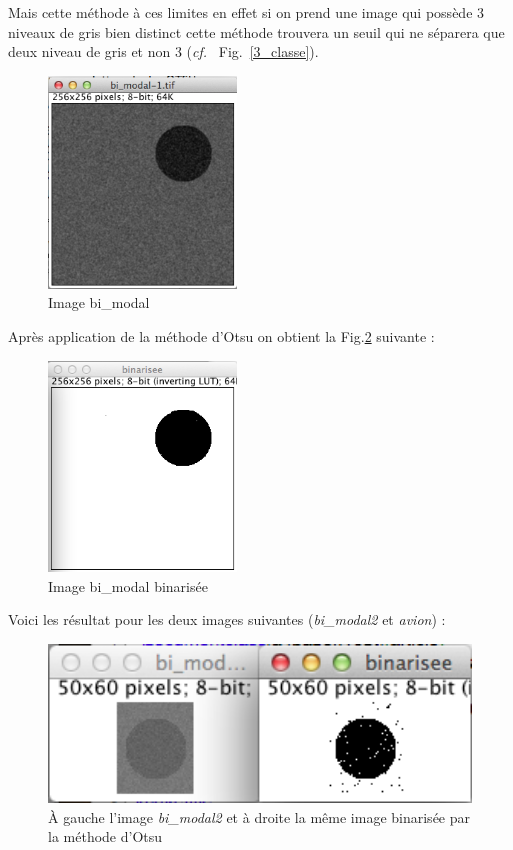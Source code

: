 \documentclass[a4paper,10pt]{article}
\begin{document}
Mais cette m\'ethode \`a ces limites en effet si on prend une image qui poss\`ede 3 niveaux de gris bien distinct cette m\'ethode trouvera un seuil qui ne s\'eparera que deux niveau de gris et non 3 (\emph{cf.} ~Fig.~\ref{3_classe}).


\begin{figure}[ht]
\begin{center}
	\includegraphics[width=5cm]{images/bi_modal}
\end{center}
	\caption{Image bi\_modal}
	\label{bi_modal}
\end{figure}

Apr\`es application de la m\'ethode d'Otsu on obtient la Fig.\ref{binarisee} suivante : 

\begin{figure}[ht]
\begin{center}
	\includegraphics[width=5cm]{images/bi_modal_binarisee}
\end{center}
	\caption{Image bi\_modal binaris\'ee}
	\label{binarisee}
\end{figure}

\newpage

Voici les r\'esultat pour les deux images suivantes (\emph{bi\_modal2} et \emph{avion}) :

\begin{figure}[ht]
\begin{center}
	\includegraphics[width=13cm]{images/bi_modal_2}
\end{center}
	\caption{\`A gauche l'image \emph{bi\_modal2} et \`a droite la m\^eme image binaris\'ee par la m\'ethode d'Otsu}
	\label{}
\end{figure}
\end{document}
